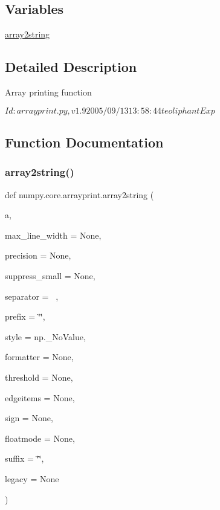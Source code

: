 \subsection*{Variables}
\begin{DoxyCompactItemize}
\item 
\hyperlink{namespacenumpy_1_1core_1_1arrayprint_a057c4e8e7e998179b1313a761873514a}{array2string}
\end{DoxyCompactItemize}


\subsection{Detailed Description}
\begin{DoxyVerb}Array printing function

$Id: arrayprint.py,v 1.9 2005/09/13 13:58:44 teoliphant Exp $\end{DoxyVerb}
 

\subsection{Function Documentation}
\mbox{\label{namespacenumpy_1_1core_1_1arrayprint_a0460bad6747319f766bf7ceb8f40e593}} 
\subsubsection{\texorpdfstring{array2string()}{array2string()}}
{\footnotesize\ttfamily def numpy.\+core.\+arrayprint.\+array2string (\begin{DoxyParamCaption}\item[{}]{a,  }\item[{}]{max\+\_\+line\+\_\+width = {\ttfamily None},  }\item[{}]{precision = {\ttfamily None},  }\item[{}]{suppress\+\_\+small = {\ttfamily None},  }\item[{}]{separator = {\ttfamily \textquotesingle{}~\textquotesingle{}},  }\item[{}]{prefix = {\ttfamily \char`\"{}\char`\"{}},  }\item[{}]{style = {\ttfamily np.\+\_\+NoValue},  }\item[{}]{formatter = {\ttfamily None},  }\item[{}]{threshold = {\ttfamily None},  }\item[{}]{edgeitems = {\ttfamily None},  }\item[{}]{sign = {\ttfamily None},  }\item[{}]{floatmode = {\ttfamily None},  }\item[{}]{suffix = {\ttfamily \char`\"{}\char`\"{}},  }\item[{}]{legacy = {\ttfamily None} }\end{DoxyParamCaption})}

